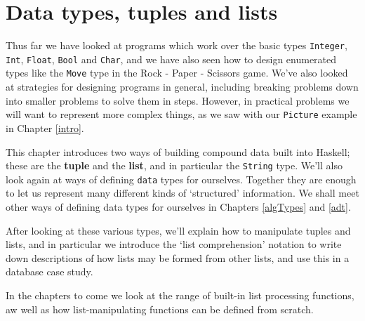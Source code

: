 %

\chapter{Data types, tuples and lists}
\chapstart
\label{tupleList}

Thus far we have looked at programs which work over the basic types \texttt{Integer}, \texttt{Int}, \texttt{Float}, \texttt{Bool} and \texttt{Char}, and we have also seen how to design enumerated types like the \texttt{Move} type in the Rock - Paper - Scissors game. We've also looked at strategies for designing programs in general, including breaking problems down into smaller problems to solve them in steps.
However, in practical problems we will want to represent more complex things, 
as we saw with our \texttt{Picture} example 
in Chapter \ref{intro}.

This chapter introduces two ways of building compound data built into Haskell; these are the \textbf{tuple} and the \textbf{list}, and in particular the \texttt{String} type. We'll also look again at ways of defining \texttt{data} types for ourselves. Together they are enough
to let us represent many different kinds of `structured' information.
We shall meet other ways of defining data types for ourselves 
in Chapters \ref{algTypes} and \ref{adt}. 

After looking at these various types, we'll explain how to manipulate tuples and lists, and in particular we introduce the `list
comprehension' notation to write down descriptions of how lists may be formed 
from other lists, and use this in a database case study. 

In the chapters to come we look at the range of built-in list processing functions, aw well as how list-manipulating functions can be defined from scratch.

\begin{webvideos}
\end{webvideos}

